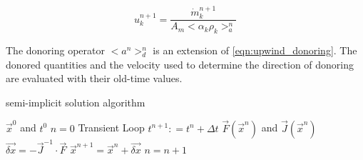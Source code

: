 \begin{equation}
\label{eqn:si_vel}
u^{n+1}_k = \frac{\dot{m}^{n+1}_k}{A_m <\alpha_k \rho_k>^{n}_{a}} 
\end{equation}

The donoring operator $<a^n>^{n}_{d}$ is an extension of \eqref{eqn:upwind_donoring}.
The donored quantities and the velocity used to determine the direction of donoring are evaluated with their old-time values.

\begin{algo}[H]
\caption{\cobra semi-implicit solution algorithm}
\label{alg:si_legacy}
\setlength{\baselineskip}{0.625\baselineskip}
\begin{algorithmic}[1]
\Require $\vec{x}^{0}$ and $t^{0}$
\Set $n = 0$
\Loop \; Transient Loop
    \State $t^{n+1} : = t^{n} + \Delta t$
	\Calculate $\vec{F}(\vec{x}^{n})$ and $\vec{J}(\vec{x}^{n})$
	\BlackBox $\vec{\delta x} = - \vec{J}^{-1}\cdot\vec{F}$
	\Calculate $\vec{x}^{n+1} = \vec{x}^{n} + \vec{\delta x}$
	\State $n = n + 1$
\EndLoop
\end{algorithmic}
\end{algo}

